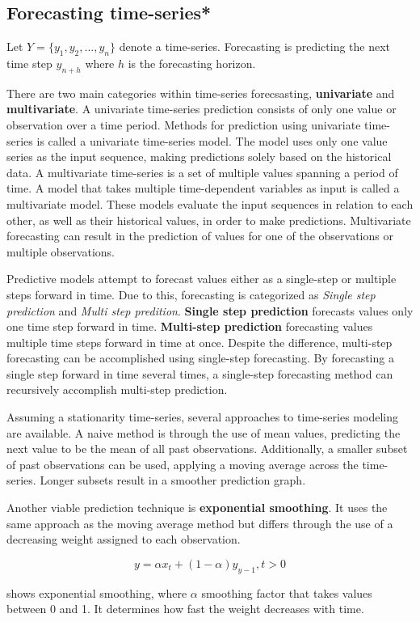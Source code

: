 
\subsection{Forecasting time-series*}
\label{section:BT:forecasting-time-series}
Let  $Y = \{y_1, y_2, ..., y_n\}$ denote a time-series.
Forecasting is predicting the next time step $y_{n+h}$ where $h$ is the forecasting horizon.

There are two main categories within time-series forecsasting, \textbf{univariate} and \textbf{multivariate}.
A univariate time-series prediction consists of only one value or observation over a time period.
Methods for prediction using univariate time-series is called a univariate time-series model.
The model uses only one value series as the input sequence, making predictions solely based on the historical data.
A multivariate time-series is a set of multiple values spanning a period of time.
A model that takes multiple time-dependent variables as input is called a multivariate model.
These models evaluate the input sequences in relation to each other, as well as their historical values, in order to make predictions.
Multivariate forecasting can result in the prediction of values for one of the observations or multiple observations.

Predictive models attempt to forecast values either as a single-step or multiple steps forward in time.
Due to this, forecasting is categorized as \textit{Single step prediction} and \textit{Multi step predition}.
\textbf{Single step prediction} forecasts values only one time step forward in time.
\textbf{Multi-step prediction} forecasting values multiple time steps forward in time at once.
Despite the difference, multi-step forecasting can be accomplished using single-step forecasting.
By forecasting a single step forward in time several times, a single-step forecasting method can recursively accomplish multi-step prediction.


Assuming a stationarity time-series, several approaches to time-series modeling are available.
A naive method is through the use of mean values, predicting the next value to be the mean of all past observations.
Additionally, a smaller subset of past observations can be used, applying a moving average across the time-series.
Longer subsets result in a smoother prediction graph.

Another viable prediction technique is \textbf{exponential smoothing}.
It uses the same approach as the moving average method but differs through the use of
a decreasing weight assigned to each observation.

\begin{equation}
  \label{eq:exponential_smoothing}
  y = \alpha x_t + (1 - \alpha)y_{y-1}, t > 0
\end{equation}

shows exponential smoothing, where $\alpha$ smoothing factor
that takes values between 0 and 1. It determines how fast the weight decreases with time.



